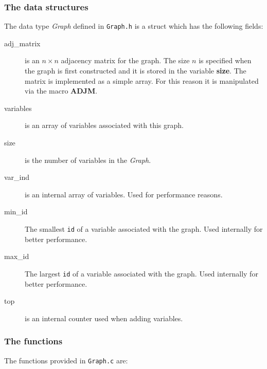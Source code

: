 \documentclass[12pt,a4paper]{report}
\newcommand{\cdatatype}[1]{{\it #1}}
\newcommand{\examplecode}[1]{\texttt{#1}}
\newcommand{\cfilename}[1]{\texttt{#1}}
\newcommand{\cparameter}[1]{\textbf{#1}}
\begin{document}
\subsubsection{The data structures}
The data type \cdatatype{Graph} defined in \cfilename{Graph.h} is a
struct which has the following fields:
\begin{description}
\item[adj\_matrix] is an $n\times n$ adjacency matrix for the
graph. The size $n$ is specified when the graph is first constructed
and it is stored in the variable \cparameter{size}. The matrix is
implemented as a simple array. For this reason it is manipulated via
the macro \cparameter{ADJM}.
\item[variables] is an array of variables associated with this graph.
\item[size] is the number of variables in the \cdatatype{Graph}.
\item[var\_ind] is an internal array of variables. Used for
performance reasons.
\item[min\_id] The smallest \examplecode{id} of a variable associated
with the graph. Used internally for better performance.
\item[max\_id] The largest \examplecode{id} of a variable associated
with the graph. Used internally for better performance.
\item[top] is an internal counter used when adding variables. 
\end{description}


\subsubsection{The functions}

The functions provided in \cfilename{Graph.c} are:
\end{document}
